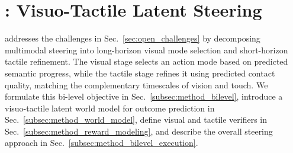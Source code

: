 

\section{\ours: \textbf{Vi}suo-\textbf{Ta}ctile \textbf{L}atent Steering}
\label{sec:method}
\ours addresses the challenges in Sec.~\ref{sec:open_challenges} by decomposing multimodal steering into long-horizon visual mode selection and short-horizon tactile refinement. The visual stage selects an action mode based on predicted semantic progress, while the tactile stage refines it using predicted contact quality, matching the complementary timescales of vision and touch. We formulate this bi-level objective in Sec.~\ref{subsec:method_bilevel}, introduce a visuo-tactile latent world model for outcome prediction in Sec.~\ref{subsec:method_world_model}, define visual and tactile verifiers in Sec.~\ref{subsec:method_reward_modeling}, and describe the overall steering approach in Sec.~\ref{subsec:method_bilevel_execution}.















